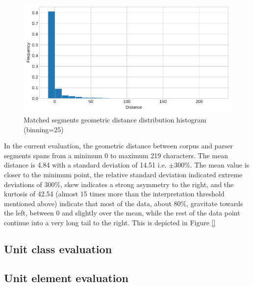     \begin{figure}[!ht]
    \centering
    \includegraphics[width=.65\textwidth]{evaluation-results/figures/distance-distribution-histogram-Geometric-25.pdf}
    \caption{Matched segments geometric distance distribution histogram (binning=25)}
    \label{fig:segment-distance-histogram-full}
    \end{figure}

    In the current evaluation, the geometric distance between corpus and parser segments spans from a minimum 0 to maximum 219 characters. The mean distance is 4.84 with a standard deviation of 14.51 i.e. $\pm$300\%. The mean value is closer to the minimum point, the relative standard deviation indicated extreme deviations of 300\%, skew indicates a strong asymmetry to the right, and the kurtosis of 42.54 (almost 15 times more than the interpretation threshold mentioned above) indicate that most of the data, about 80\%, gravitate towards the left, between 0 and slightly over the mean, while the rest of the data point continue into a very long tail to the right. This is depicted in Figure \ref{}
    


\subsection{Unit class evaluation}
\label{sec:unit-class-evaluation}

\subsection{Unit element evaluation}
\label{sec:unit-element-evaluation}


